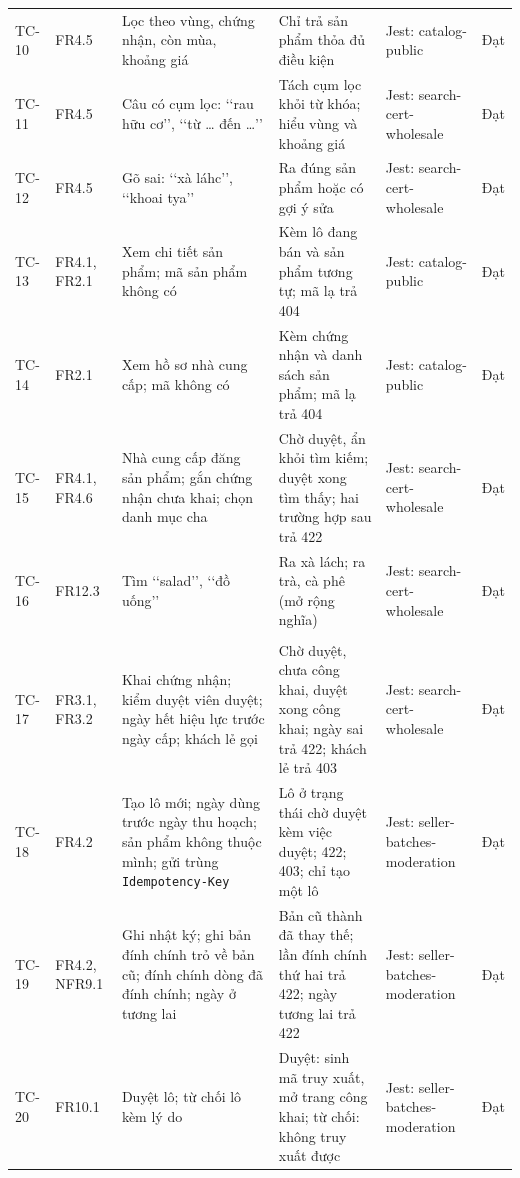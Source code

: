 \begin{longtable}{L{1.40cm} L{1.55cm} L{4.00cm} L{4.05cm} L{1.95cm} L{1.95cm}}
TC-10 & FR4.5 & Lọc theo vùng, chứng nhận, còn mùa, khoảng giá & Chỉ trả sản phẩm thỏa đủ điều kiện & Jest: catalog-public & Đạt \\
TC-11 & FR4.5 & Câu có cụm lọc: \lq\lq rau hữu cơ\rq\rq, \lq\lq từ \ldots{} đến \ldots{}\rq\rq & Tách cụm lọc khỏi từ khóa; hiểu vùng và khoảng giá & Jest: search-cert-wholesale & Đạt \\
TC-12 & FR4.5 & Gõ sai: \lq\lq xà láhc\rq\rq, \lq\lq khoai tya\rq\rq & Ra đúng sản phẩm hoặc có gợi ý sửa & Jest: search-cert-wholesale & Đạt \\
TC-13 & FR4.1, FR2.1 & Xem chi tiết sản phẩm; mã sản phẩm không có & Kèm lô đang bán và sản phẩm tương tự; mã lạ trả 404 & Jest: catalog-public & Đạt \\
TC-14 & FR2.1 & Xem hồ sơ nhà cung cấp; mã không có & Kèm chứng nhận và danh sách sản phẩm; mã lạ trả 404 & Jest: catalog-public & Đạt \\
TC-15 & FR4.1, FR4.6 & Nhà cung cấp đăng sản phẩm; gắn chứng nhận chưa khai; chọn danh mục cha & Chờ duyệt, ẩn khỏi tìm kiếm; duyệt xong tìm thấy; hai trường hợp sau trả 422 & Jest: search-cert-wholesale & Đạt \\
TC-16 & FR12.3 & Tìm \lq\lq salad\rq\rq, \lq\lq đồ uống\rq\rq & Ra xà lách; ra trà, cà phê (mở rộng nghĩa) & Jest: search-cert-wholesale & Đạt \\
 \\
TC-17 & FR3.1, FR3.2 & Khai chứng nhận; kiểm duyệt viên duyệt; ngày hết hiệu lực trước ngày cấp; khách lẻ gọi & Chờ duyệt, chưa công khai, duyệt xong công khai; ngày sai trả 422; khách lẻ trả 403 & Jest: search-cert-wholesale & Đạt \\
TC-18 & FR4.2 & Tạo lô mới; ngày dùng trước ngày thu hoạch; sản phẩm không thuộc mình; gửi trùng \texttt{Idempotency-Key} & Lô ở trạng thái chờ duyệt kèm việc duyệt; 422; 403; chỉ tạo một lô & Jest: seller-batches-moderation & Đạt \\
TC-19 & FR4.2, NFR9.1 & Ghi nhật ký; ghi bản đính chính trỏ về bản cũ; đính chính dòng đã đính chính; ngày ở tương lai & Bản cũ thành đã thay thế; lần đính chính thứ hai trả 422; ngày tương lai trả 422 & Jest: seller-batches-moderation & Đạt \\
TC-20 & FR10.1 & Duyệt lô; từ chối lô kèm lý do & Duyệt: sinh mã truy xuất, mở trang công khai; từ chối: không truy xuất được & Jest: seller-batches-moderation & Đạt \\

\end{longtable}

